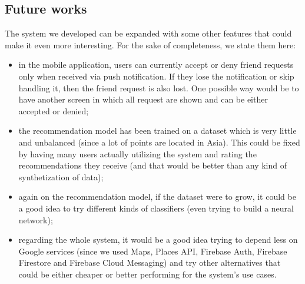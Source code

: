 \documentclass[../../main]{subfiles}
\begin{document}
\subsection{Future works}
The system we developed can be expanded with some other features that could make it even more interesting. For the sake of completeness, we state them here:
\begin{itemize}
    \item in the mobile application, users can currently accept or deny friend requests only when received via push notification. 
    If they lose the notification or skip handling it, then the friend request is also lost.
    One possible way would be to have another screen in which all request are shown and can be either accepted or denied;
    \item the recommendation model has been trained on a dataset which is very little and unbalanced (since a lot of points are located in Asia).
    This could be fixed by having many users actually utilizing the system and rating the recommendations they receive (and that would be better than any kind of synthetization of data);
    \item again on the recommendation model, if the dataset were to grow, it could be a good idea to try different kinds of classifiers (even trying to build a neural network);
    \item regarding the whole system, it would be a good idea trying to depend less on Google services (since we used Maps, Places API, Firebase Auth, Firebase Firestore and Firebase Cloud Messaging) and try other alternatives that could be either cheaper or better performing for the system's use cases.
\end{itemize}
\end{document}
